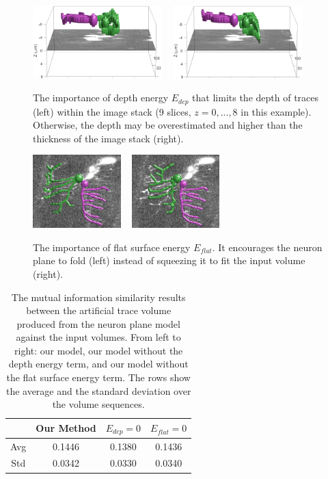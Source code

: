 \documentclass[10pt,letterpaper]{article}
\begin{document}
\begin{figure}
	\centering
	\includegraphics[height=80pt]{img/norm2}
	~
	\includegraphics[height=80pt]{img/dep2}
	\caption{The importance of depth energy $E_{dep}$ that limits the depth of traces (left) within the image stack (9 slices, $z=0,...,8$ in this example). Otherwise, the depth may be overestimated and higher than the thickness of the image stack (right).}
	\label{fig:Edep}
\end{figure}

\begin{figure}
	\centering
	\includegraphics[height=80pt]{img/norm1}
	~
	\includegraphics[height=80pt]{img/flat1}
	\caption{The importance of flat surface energy $E_{flat}$. It encourages the neuron plane to fold (left) instead of squeezing it to fit the input volume (right).}
	\label{fig:Eflat}
\end{figure}





\begin{table}[b]
	\centering
	\begin{tabular}{|c|c|c|c|}
		\hline 
		& Our Method & $E_{dep} = 0$ & $E_{flat} = 0$ \\ 
		\hline 
		Avg & 0.1446 & 0.1380 & 0.1436 \\ \hline
		Std & 0.0342 & 0.0330 & 0.0340 \\
		\hline 
	\end{tabular}
	\caption{The mutual information similarity results between the artificial trace volume produced from the neuron plane model against the input volumes. From left to right: our model, our model without the depth energy term, and our model without the flat surface energy term. The rows show the average and the standard deviation over the volume sequences.}
	\label{tab:result}
\end{table}
\end{document}
